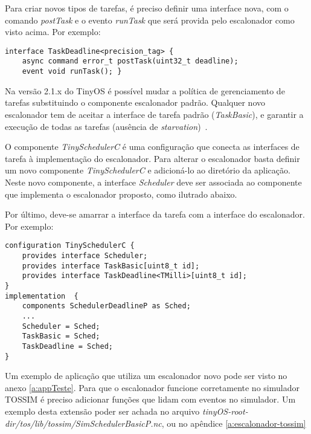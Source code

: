 Para criar novos tipos de tarefas, é preciso
definir uma interface nova, com o comando \textit{postTask} e o evento
\textit{runTask} que será provida pelo escalonador como visto acima. Por exemplo:
\begin{lstlisting}
interface TaskDeadline<precision_tag> { 
    async command error_t postTask(uint32_t deadline);
    event void runTask(); }
\end{lstlisting}

Na versão 2.1.x do TinyOS é possível mudar a política de gerenciamento de tarefas substituindo 
o componente escalonador padrão. Qualquer novo escalonador tem de
aceitar a interface de tarefa padrão (\textit{TaskBasic}), e garantir a execução de todas as tarefas 
(ausência de {\em starvation})~\cite{TEP106}.

O componente \textit{TinySchedulerC} é uma configuração que conecta as interfaces de tarefa à implementação do
escalonador.
Para alterar o escalonador basta definir um novo componente \textit{TinySchedulerC} e adicioná-lo ao diretório da
aplicação. Neste novo componente, a interface \textit{Scheduler} deve ser associada ao componente que implementa o
escalonador proposto, como ilutrado abaixo.

Por último, deve-se amarrar a interface da tarefa com a interface do escalonador. Por exemplo:
\begin{lstlisting}
configuration TinySchedulerC {
    provides interface Scheduler;
    provides interface TaskBasic[uint8_t id];
    provides interface TaskDeadline<TMilli>[uint8_t id];
}
implementation  {
    components SchedulerDeadlineP as Sched;
    ...
    Scheduler = Sched;
    TaskBasic = Sched; 
    TaskDeadline = Sched;
}
\end{lstlisting}

Um exemplo de aplicação que utiliza um escalonador novo pode ser visto no anexo \ref{a:appTeste}.
Para que o escalonador funcione corretamente no simulador TOSSIM é preciso adicionar funções que lidam com eventos no
simulador. Um exemplo desta extensão poder ser achada no arquivo
\textit{tinyOS-root-dir/tos/lib/tossim/SimSchedulerBasicP.nc}, ou no apêndice \ref{a:escalonador-tossim}
